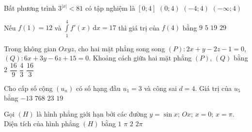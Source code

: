 \begin{ex}%
	Bất phương trình $3^{\left|x\right|}<81$ có tập nghiệm là
	\choice
	{$\left[0;4\right]$}
	{$\left(0;4\right)$}
	{\True $\left(-4;4\right)$}
	{$\left(-\infty ;4\right)$}
\end{ex}

\begin{ex}%
	Nếu $f(1)=12$ và $\displaystyle\int\limits_1^4f'(x)\mathrm{\,d}x=17$ thì giá trị của $f(4)$ bằng
	\choice
	{$ 9$}
	{$ 5$}
	{$ 19$}
	{\True $ 29$}
\end{ex}

\begin{ex}%
	Trong không gian $Oxyz$, cho hai mặt phẳng song song $(P)\colon 2x+y-2z-1=0$, $(Q)\colon 6x+3y-6z+15=0$. Khoảng cách giữa hai mặt phẳng $(P)$, $(Q)$ bằng
	\choice
	{\True $2$}
	{$\dfrac{16}{9}$}
	{$\dfrac{4}{3}$}
	{$\dfrac{16}{3}$}
\end{ex}

\begin{ex}%
	Cho cấp số cộng $\left(u_n\right)$ có số hạng đầu $u_1=3$ và công sai $d=4$. Giá trị của $u_5$ bằng
	\choice
	{$-13$}
	{$768$}
	{$23$}
	{\True $19$}
\end{ex}

\begin{ex}%
	Gọi $(H)$ là hình phẳng giới hạn bởi các đường $ y=\sin x$; $Ox$; $x=0$; $x=\pi $. Diện tích của hình phẳng $(H)$ bằng
	\choice
	{$1$}
	{$\pi$}
	{\True $2$}
	{$2\pi$}
\end{ex}

